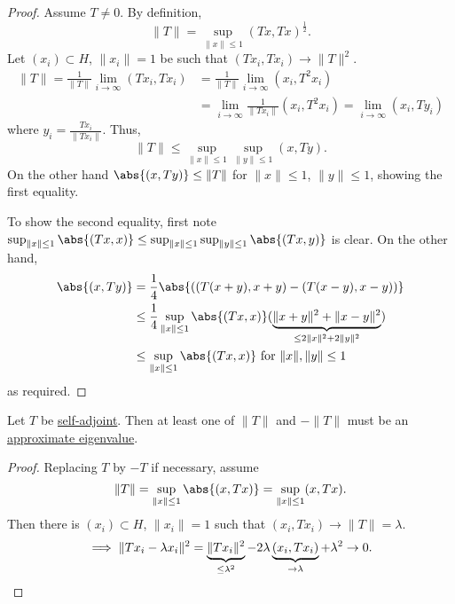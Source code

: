 \documentclass{article}
\begin{document}
\begin{proof}
    Assume $T \neq 0$. By definition,
    \begin{equation*}
        \|T\| = \sup_{\|x\| \leq 1} (Tx,Tx)^\frac{1}{2}.
    \end{equation*}
    Let $(x_i) \subset H$, $\|x_i\| = 1$ be such that $(T x_i, T x_i) \to \|T\|^2$.
    \begin{align*}
        \|T\| = \frac{1}{\|T\|} \lim_{i \to \infty} (T x_i, T x_i) &= \frac{1}{\|T\|} \lim_{i \to \infty} (x_i, T^2 x_i) \\
                                                                         &= \lim_{i \to \infty} \frac{1}{\|T x_i\|} (x_i, T^2 x_i) = \lim_{i \to \infty} (x_i, T y_i)
    \end{align*}
    where $y_i = \frac{T x_i}{\|T x_i\|}$. Thus,
    \begin{equation*}
        \|T\| \leq \sup_{\|x\| \leq 1} \sup_{\|y\| \leq 1} (x, Ty).
    \end{equation*}
    On the other hand $\abs{(x, Ty)} \leq \|T\|$ for $\|x\| \leq 1$, $\|y\| \leq 1$, showing the first equality.

    To show the second equality, first note $\sup_{\|x\| \leq 1} \abs{(Tx,x)} \leq \sup_{\|x\| \leq 1} \sup_{\|y\| \leq 1} \abs{(Tx, y)}$ is clear. On the other hand,
    \begin{align*}
        \abs{(x, Ty)} &= \frac{1}{4} \abs{((T(x+y),x+y) - (T(x-y),x-y))} \\
        &\leq \frac{1}{4} \sup_{\|x\| \leq 1} \abs{(Tx,x)} (\underbrace{\|x+y\|^2 + \|x-y\|^2}_{\leq 2 \|x\|^2 + 2 \|y\|^2}) \\
        &\leq \sup_{\|x\| \leq 1} \abs{(Tx,x)} \text{ for }\|x\|, \|y\| \leq 1
    \end{align*}
    as required.
\end{proof}

\begin{lemma}
    Let $T$ be \hyperlink{def:normalMap}{self-adjoint}. Then at least one of $\|T\|$ and $-\|T\|$ must be an \hyperlink{def:ap}{approximate eigenvalue}.
\end{lemma}

\begin{proof}
    Replacing $T$ by $-T$ if necessary, assume
    \begin{equation*}
        \|T\| = \sup_{\|x\| \leq 1} \abs{(x, Tx)} = \sup_{\|x\| \leq 1} (x, Tx).
    \end{equation*}
    Then there is $(x_i) \subset H$, $\|x_i\| = 1$ such that $(x_i, T x_i) \to \|T\| = \lambda$.
    \begin{equation*}
        \implies \|T x_i - \lambda x_i\|^2 = \underbrace{\|T x_i\|^2}_{\leq \lambda^2} - 2 \lambda \underbrace{(x_i, T x_i)}_{\to \lambda} + \lambda^2 \to 0. \qedhere
    \end{equation*}
\end{proof}
\end{document}
